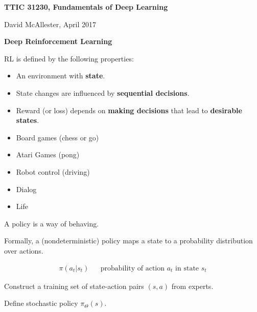 



{\Huge

  \centerline{\bf TTIC 31230, Fundamentals of Deep Learning}
  \bigskip
  \centerline{David McAllester, April 2017}
\vfill
  \centerline{\bf Deep Reinforcement Learning}
  \vfill
\vfill


RL is defined by the following properties:

\vfill
\begin{itemize}
\item An environment with {\bf state}.

  \vfill
\item State changes are influenced by {\bf sequential decisions}.

  \vfill
\item  Reward (or loss) depends on {\bf making decisions} that lead to {\bf desirable states}.
\end{itemize}


\begin{itemize}
\item Board games (chess or go)

  \vfill
\item Atari Games (pong)

  \vfill
\item Robot control (driving)

  \vfill
\item Dialog

  \vfill
\item Life

\end{itemize}


A policy is a way of behaving.

\vfill
Formally, a (nondeterministic) policy maps a state to a probability distribution over actions.

\vfill
\begin{eqnarray*}
    \pi(a_t|s_t) & & \mbox{probability of action $a_t$ in state $s_t$}
\end{eqnarray*}


Construct a training set of state-action pairs $(s,a)$ from experts.

\vfill
Define stochastic policy $\pi_\Theta(s)$.

}
